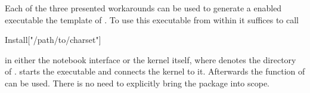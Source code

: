 Each of the three presented workarounds can be used to generate a \MathLink enabled executable  the \MathLink template of . To use this executable from within \Mathematica it suffices to call

\begin{mathematicaprogram}
Install["/path/to/charset"]
\end{mathematicaprogram}

in either the notebook interface or the kernel itself, where  denotes the directory of .  starts the  executable and connects the kernel to it. Afterwards the function  of  can be used. There is no need to explicitly bring the package  into scope.





%
%
%
%
%
%
%
%
%
%
%




